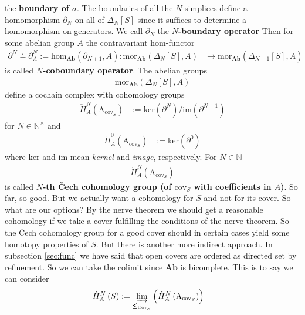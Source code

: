 the \textbf{boundary of $\sigma$}. The boundaries of all the $N$-simplices define a homomorphism $\partial_{N}$ on all of $\Delta_{N}[S]$ since it suffices to determine a homomorphism on generators. We call $\partial_{N}$ the \textbf{$N$-boundary operator} Then for some abelian group $A$ the contravariant hom-functor
\begin{align*}
  \partial^{N}
  \doteq
  \partial_{A}^{N}
  :=
  \mathrm{hom}_{\mathbf{Ab}}(\partial_{N+1},A)
  \colon
  \mathrm{mor}_{\mathbf{Ab}}
  \left(
    \Delta_{N}[S],
    A
  \right)
  &\rightarrow
  \mathrm{mor}_{\mathbf{Ab}}
  \left(
    \Delta_{N+1}[S],
    A
  \right)
\end{align*}
is called \textbf{$N$-coboundary operator}. The abelian groups
\begin{align*}
  \mathrm{mor}_{\mathbf{Ab}}
  \left(
    \Delta_{N}[S],
    A
  \right)
\end{align*}
define a cochain complex with cohomology groups
\begin{align*}
  \check{H}_{A}^{N}
  \left(
    \mathrm{A}_{\mathrm{cov}_{S}}
  \right)
  &:=
  \mathrm{ker}
  \left(
    \partial^{N}
  \right)
  \slash
  \mathrm{im}
  \left(
    \partial^{N-1}
  \right)
\end{align*}
for $N \in \mathbb{N}^{\times}$ and
\begin{align*}
  \check{H}_{A}^{0}
  \left(
    \mathrm{A}_{\mathrm{cov}_{S}}
  \right)
  &:=
  \mathrm{ker}
  \left(
    \partial^{0}
  \right)
\end{align*}
where $\mathrm{ker}$ and $\mathrm{im}$ mean \textit{kernel} and \textit{image}, respectively. For $N \in \mathbb{N}$ 
\begin{align*}
  \check{H}_{A}^{N}
  \left(
    \mathrm{A}_{\mathrm{cov}_{S}}
  \right)
\end{align*}
is called \textbf{$N$-th \v{C}ech cohomology group (of $\mathrm{cov}_{S}$ with coefficients in $A$)}. So far, so good. But we actually want a cohomology for $S$ and not for its cover. So what are our options? By the nerve theorem we should get a reasonable cohomology if we take a cover fulfilling the conditions of the nerve theorem. So the \v{C}ech cohomology group for a good cover should in certain cases yield some homotopy properties of $S$. But there is another more indirect approach. In subsection \ref{sec:func} we have said that open covers are ordered as directed set by refinement. So we can take the colimit since $\mathbf{Ab}$ is bicomplete. This is to say we can consider
\begin{align*}
  \check{H}_{A}^{N}
  \left(
    S
  \right)
  &:=
  \varinjlim_{\pmb{\leq}_{\mathrm{Cov}_{S}}}
  \left(
    \check{H}_{A}^{N}
    \left(
      \mathrm{A}_{\mathrm{cov}_{S}}
    \right)
  \right)
\end{align*}
